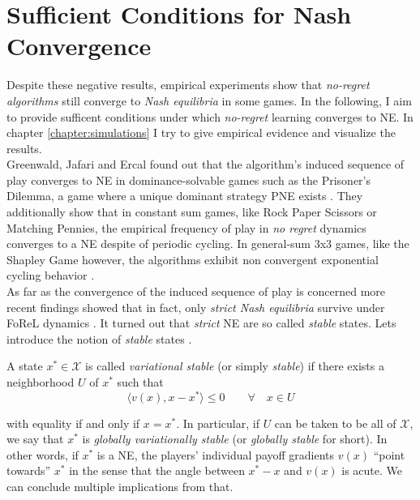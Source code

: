 \section{Sufficient Conditions for Nash Convergence}\label{section:SufficientConditionsForNash Convergence}

Despite these negative results, empirical experiments show that \textit{no-regret algorithms} still converge to \textit{Nash equilibria} in some games. In the following, I aim to provide sufficent conditions under which \textit{no-regret} learning converges to NE. In chapter \ref{chapter:simulations} I try to give empirical evidence and visualize the results. \\

Greenwald, Jafari and Ercal found out that the algorithm's induced sequence of play converges to  NE in dominance-solvable games such as the Prisoner's Dilemma, a game where a unique dominant strategy PNE exists \cite{jafari}. They additionally show that in constant sum games, like Rock Paper Scissors or Matching Pennies, the empirical frequency of play in \textit{no regret} dynamics converges to a NE despite of periodic cycling. In general-sum 3x3 games, like the Shapley Game however, the algorithms exhibit non convergent exponential cycling behavior \cite{jafari}. \\

As far as the convergence of the induced sequence of play is concerned more recent findings showed that in fact, only \textit{strict Nash equilibria} survive under FoReL dynamics \cite{flokas}. It turned out that \textit{strict} NE are so called \textit{stable} states. Lets introduce the notion of \textit{stable} states \cite[Def. 2.3]{mertikopoulos}. 

\begin{definition}\label{def:stability}
    A state $x^* \in \mathcal{X}$ is called \textit{variational stable} (or simply \textit{stable}) if there exists a neighborhood $U$ of $x^*$ such that 
    \[\langle v(x),x-x^*\rangle \le 0 \qquad \forall \quad x \in U\]
\end{definition}

with equality if and only if $x = x^*$. In particular, if $U$ can be taken to be all of $\mathcal{X}$, we say that $x^*$ is \textit{globally variationally stable} (or \textit{globally stable} for short). In other words, if $x^*$ is a NE, the players’ individual payoff gradients $v(x)$ “point towards” $x^*$ in the sense that the angle between $x^* - x$ and $v(x)$ is acute. We can conclude multiple implications from that.\\

